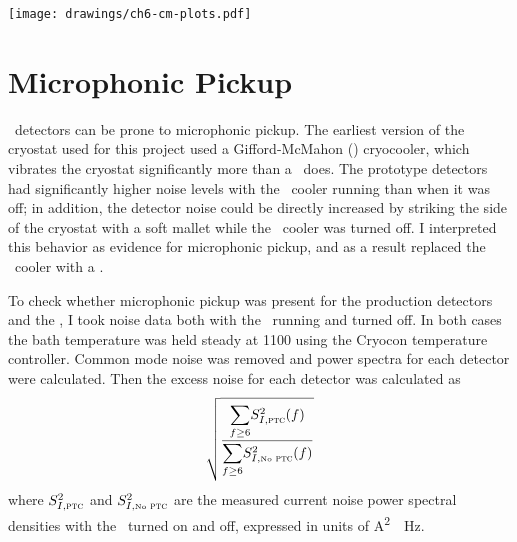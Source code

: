 \begin{figure*}
\texttt{[image: drawings/ch6-cm-plots.pdf]}
\caption[Plots summarizing common mode signal and $1/f$ noise]{
Plots summarizing common mode signal and $1/f$ noise.
\textbf{Upper Left}
Plot showing raw detector output for 15 detectors over a 10-minute data acquisition.
The data was acquired at \SI{312.5}{\Hz}, but only every 100th data point is plotted.
\textbf{Upper Right} 
The same data after removal of the common mode signal (as defined in the text).
\textbf{Lower Left} 
Current noise power spectral density for the raw data, the raw data minus the common mode (``No CM''), the raw data minus the common mode and the best-fit 4th-order polynomial (``No CM, Poly''), and the common mode itself (``CM'').
The strong noise peak at \SI{1.411}{\Hz} is due to the \PTC, as explained in the text.
\textbf{Lower Right} 
Raw timestream for , after conversion to an equivalent bath temperature variation, as described in the text.
}
\label{fig:ch6-cm-plots}
\end{figure*}

\section{Microphonic Pickup} \label{sec:ch6-microphonic-pickup}


\TES\ detectors can be prone to microphonic pickup.
The earliest version of the cryostat used for this project used a Gifford-McMahon (\GM) cryocooler, which vibrates the cryostat significantly more than a \PTC\ does.
The prototype detectors had significantly higher noise levels with the \GM\ cooler running than when it was off; in addition, the detector noise could be directly increased by striking the side of the cryostat with a soft mallet while the \GM\ cooler was turned off.
I interpreted this behavior as evidence for microphonic pickup, and as a result replaced the \GM\ cooler with a \PTC.

To check whether microphonic pickup was present for the production detectors and the \PTC, I took noise data both with the \PTC\ running and turned off.
In both cases the bath temperature was held steady at \SI{1100}{\mK} using the Cryocon temperature controller.
Common mode noise was removed and power spectra for each detector were calculated.
Then the excess noise for each detector was calculated as
\begin{equation}
  \sqrt{  \frac{ {\displaystyle \sum_{f \ge 6}} S^2_{I,\textsc{ptc}}(f) }
               { {\displaystyle \sum_{f \ge 6}} S^2_{I,\mbox{\tiny{No}}\textsc{ ptc}}(f) }}
\end{equation}
where $S^2_{I,\textsc{ptc}}$ and $S^2_{I,\mbox{\tiny{No}}\textsc{ ptc}}$ are the measured current noise power spectral densities with the \PTC\ turned on and off, expressed in units of \si{\A^2 \per \Hz}.

